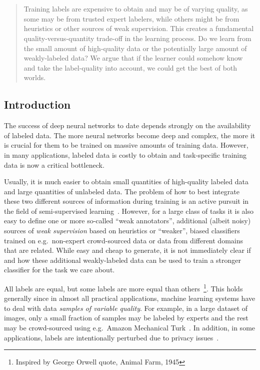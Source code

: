 \chapter{}

\label{chap:5}
%
\begin{quote}
Training labels are expensive to obtain and may be of varying quality, as some may be from trusted expert labelers, while others might be from heuristics or other sources of weak supervision. This creates a fundamental quality-versus-quantity trade-off in the learning process.  Do we learn from the small amount of high-quality data or the potentially large amount of weakly-labeled data? We argue that if the learner could somehow know and take the label-quality into account, we could get the best of both worlds.
\end{quote}
%
\section{Introduction}
The success of deep neural networks to date depends strongly on the availability of labeled data. The more neural networks become deep and complex, the more it is crucial for them to be trained on massive amounts of training data. However, in many applications, labeled data is costly to obtain and task-specific training data is now a critical bottleneck. 

Usually, it is much easier to obtain small quantities of high-quality labeled data and large quantities of unlabeled data. The problem of how to best integrate these two different sources of information during training is an active pursuit in the field of semi-supervised learning~\citep{chap:semi06}.
However, for a large class of tasks it is also easy to define one or more so-called ``weak annotators'', additional (albeit noisy) sources of \emph{weak supervision} based on heuristics or ``weaker'', biased classifiers trained on e.g.\ non-expert crowd-sourced data or data from different domains that are related. 
While easy and cheap to generate, it is not immediately clear if and how these additional weakly-labeled data can be used to train a stronger classifier for the task we care about.

All labels are equal, but some labels are more equal than others~\footnote{Inspired by George Orwell quote, Animal Farm, 1945}. This holds generally since in almost all practical applications, machine learning systems have to deal with data \emph{samples of variable quality}. For example, in a large dataset of images, only a small fraction of samples may be labeled by experts and the rest may be crowd-sourced using e.g.\ Amazon Mechanical Turk~\citep{Veit:2017}. In addition, in some applications, labels are intentionally perturbed due to privacy issues~\citep{wainwright2012privacy,Papernot:2016, dehghani:2017:neuir}. 

